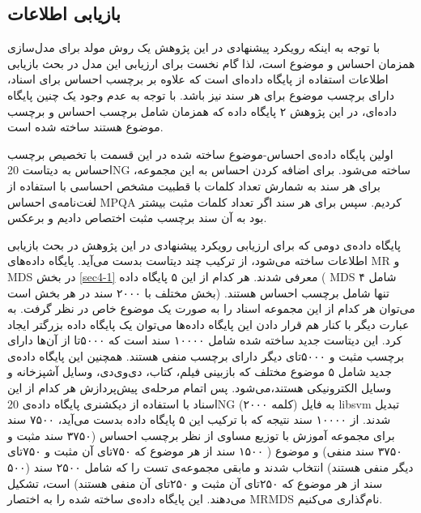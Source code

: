 \documentclass[12pt,a4paper]{article}
\begin{document}
\subsection{بازیابی اطلاعات}
\label{sec4-6}
با توجه به اینکه رویکرد پیشنهادی در  این پژوهش یک روش مولد برای مدل‌سازی همزمان احساس و موضوع است، لذا گام نخست برای ارزیابی این مدل در بحث بازیابی اطلاعات استفاده از پایگاه داده‌ای است که علاوه بر برچسب احساس برای اسناد، دارای برچسب موضوع برای هر سند نیز باشد. با توجه به عدم وجود یک چنین پایگاه داده‌ای، در این پژوهش ۲ پایگاه داده که همزمان شامل برچسب احساس و برچسب موضوع هستند ساخته شده است.

اولین پایگاه داده‌ی احساس‌-موضوع ساخته شده در این قسمت با تخصیص برچسب احساس به دیتاست 20NG ساخته می‌‌شود. برای اضافه کردن احساس به این مجموعه، برای هر سند به شمارش تعداد کلمات با قطبیت مشخص احساسی‌ با استفاده از لغت‌نامه‌ی احساس MPQA
کردیم. سپس برای هر سند اگر تعداد کلمات مثبت بیشتر بود به آن سند برچسب مثبت اختصاص دادیم و برعکس.

پایگاه داده‌ی دومی‌ که برای ارزیابی رویکرد پیشنهادی در این پژوهش در بحث بازیابی اطلاعات ساخته می‌‌شود، از ترکیب چند دیتاست بدست می‌‌آید. پایگاه داده‌های MR و MDS
در بخش‌
\ref{sec4-1}
معرفی‌ شدند. هر کدام از این ۵ پایگاه داده 
(
MDS
شامل ۴ بخش مختلف با ۲۰۰۰ سند در هر بخش است) تنها شامل برچسب احساس هستند. می‌‌توان هر کدام از این مجموعه اسناد را به صورت یک موضوع خاص در نظر گرفت. به عبارت دیگر با کنار هم قرار دادن این پایگاه داده‌ها می‌‌توان یک پایگاه داده بزرگتر ایجاد کرد. این دیتاست جدید ساخته شده شامل ۱۰۰۰۰ سند است که ۵۰۰۰تا از آن‌ها دارای برچسب مثبت و ۵۰۰۰تای دیگر دارای برچسب منفی‌ هستند. همچنین این پایگاه داده‌ی جدید شامل ۵ موضوع مختلف که بازبینی‌ فیلم، کتاب، دی‌وی‌دی، وسایل آشپزخانه و وسایل الکترونیکی‌ هستند،می‌‌شود. پس اتمام مرحله‌ی پیش‌پردازش هر کدام از این اسناد با استفاده از دیکشنری پایگاه داد‌ه‌ی 20NG (۲۰۰۰ کلمه) به فایل libsvm تبدیل شدند. از ۱۰۰۰۰ سند نتیجه که با ترکیب این ۵ پایگاه داده بدست می‌‌آید، ۷۵۰۰ سند برای مجموعه آموزش با توزیع مساوی از نظر برچسب احساس (۳۷۵۰ سند مثبت و ۳۷۵۰ سند منفی‌) و موضوع ( ۱۵۰۰ سند از هر موضوع که ۷۵۰تای آن مثبت و ۷۵۰تای دیگر منفی‌ هستند) انتخاب شدند و مابقی مجموعه‌ی تست را که شامل ۲۵۰۰ سند (۵۰۰ سند از هر موضوع که ۲۵۰تای آن مثبت و ۲۵۰تای آن منفی‌ هستند) است، تشکیل می‌‌دهند. این پایگاه داده‌ی ساخته شده را به اختصار MRMDS نام‌گذاری می‌کنیم.
\end{document}
